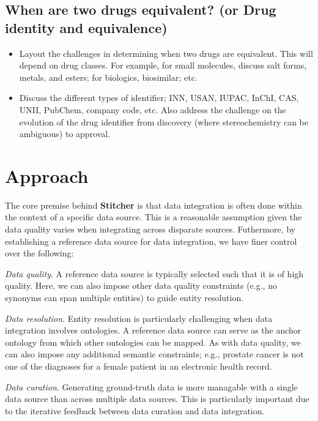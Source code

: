 \documentclass{bioinfo}
\begin{document}
\subsection{When are two drugs equivalent? (or Drug identity and equivalence)}
\begin{itemize}
\item Layout the challenges in determining when two drugs are equivalent. This will depend on drug classes. For example, for small molecules, discuss salt forms, metals, and esters; for biologics, biosimilar; etc.
\item Discuss the different types of identifier; INN, USAN, IUPAC, InChI, CAS, UNII, PubChem, company code, etc. Also address the challenge on the evolution of the drug identifier from discovery (where stereochemistry can be ambiguous) to approval.
\end{itemize}


\section{Approach}
The core premise behind \textbf{Stitcher} is that data integration is often done within the context of a specific data source. This is a reasonable assumption given the data quality varies when integrating across disparate sources. Futhermore, by establishing a reference data source for data integration, we have finer control over the following:
\begin{unlist}
\item{\emph{Data quality}.} A reference data source is typically selected such that it is of high quality. Here, we can also impose other data quality constraints (e.g., no synonyms can span multiple entities) to guide entity resolution.
\item{\emph{Data resolution}.} Entity resolution is particularly challenging when data integration involves ontologies. A reference data source can serve as the anchor ontology from which other ontologies can be mapped. As with data quality, we can also impose any additional semantic constraints; e.g., prostate cancer is not one of the diagnoses for a female patient in an electronic health record.
\item{\emph{Data curation}.} Generating ground-truth data is more managable with a single data source than across multiple data sources. This is particularly important due to the iterative feedback between data curation and data integration.
\end{unlist}
\end{document}
